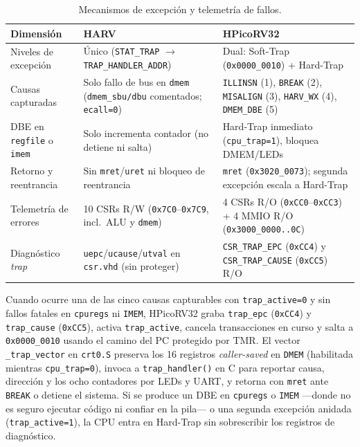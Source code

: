 \documentclass[a4paper,10pt]{article}
\begin{document}
\begin{table}[htbp]
  \centering
  \footnotesize
  \caption{Mecanismos de excepción y telemetría de fallos.}
  \label{tab:traps}
  \begin{tabularx}{\textwidth}{@{}lYY@{}}
    \toprule
    \textbf{Dimensión} & \textbf{HARV} & \textbf{HPicoRV32} \\
    \midrule
    Niveles de excepción & Único (\texttt{STAT\_TRAP} $\rightarrow$ \texttt{TRAP\_HANDLER\_ADDR}) & Dual: Soft-Trap (\texttt{0x0000\_0010}) + Hard-Trap \\
    Causas capturadas & Solo fallo de bus en \texttt{dmem} (\texttt{dmem\_sbu/dbu} comentados; \texttt{ecall=0}) & \texttt{ILLINSN} (1), \texttt{BREAK} (2), \texttt{MISALIGN} (3), \texttt{HARV\_WX} (4), \texttt{DMEM\_DBE} (5) \\
    DBE en \texttt{regfile} o \texttt{imem} & Solo incrementa contador (no detiene ni salta) & Hard-Trap inmediato (\texttt{cpu\_trap=1}), bloquea DMEM/LEDs \\
    Retorno y reentrancia & Sin \texttt{mret}/\texttt{uret} ni bloqueo de reentrancia & \texttt{mret} (\texttt{0x3020\_0073}); segunda excepción escala a Hard-Trap \\
    Telemetría de errores & 10 CSRs R/W (\texttt{0x7C0}--\texttt{0x7C9}, incl.\ ALU y \texttt{dmem}) & 4 CSRs R/O (\texttt{0xCC0}--\texttt{0xCC3}) + 4 MMIO R/O (\texttt{0x3000\_0000..0C}) \\
    Diagnóstico \textit{trap} & \texttt{uepc}/\texttt{ucause}/\texttt{utval} en \texttt{csr.vhd} (sin proteger) & \texttt{CSR\_TRAP\_EPC} (\texttt{0xCC4}) y \texttt{CSR\_TRAP\_CAUSE} (\texttt{0xCC5}) R/O \\
    \bottomrule
  \end{tabularx}
\end{table}

Cuando ocurre una de las cinco causas capturables con \texttt{trap\_active=0} y sin fallos fatales en \texttt{cpuregs} ni \texttt{IMEM}, HPicoRV32 graba \texttt{trap\_epc} (\texttt{0xCC4}) y \texttt{trap\_cause} (\texttt{0xCC5}), activa \texttt{trap\_active}, cancela transacciones en curso y salta a \texttt{0x0000\_0010} usando el camino del PC protegido por TMR. El vector \texttt{\_trap\_vector} en \texttt{crt0.S} preserva los 16 registros \textit{caller-saved} en \texttt{DMEM} (habilitada mientras \texttt{cpu\_trap=0}), invoca a \texttt{trap\_handler()} en C para reportar causa, dirección y los ocho contadores por LEDs y UART, y retorna con \texttt{mret} ante \texttt{BREAK} o detiene el sistema. Si se produce un DBE en \texttt{cpuregs} o \texttt{IMEM} —donde no es seguro ejecutar código ni confiar en la pila— o una segunda excepción anidada (\texttt{trap\_active=1}), la CPU entra en Hard-Trap sin sobrescribir los registros de diagnóstico.
\end{document}
